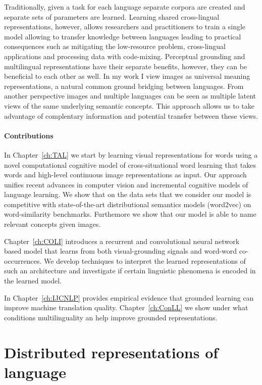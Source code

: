 Traditionally, given a task for each language separate corpora are created and
separate sets of parameters are learned.
Learning shared cross-lingual representations, however, allows researchers
and practitioners to train a single model allowing to transfer knowledge
between languages leading to practical consequences
such as mitigating the low-resource problem, cross-lingual applications and
processing data with code-mixing.
Perceptual grounding and multilingual representations have their separate benefits,
however, they can be beneficial to each other as well.
In my work I view images as universal meaning representations, a natural common
ground bridging between languages. From another perspective images and multiple
languages can be seen as multiple latent views of the same underlying semantic
concepts. This approach allows us to take advantage of complentary information
and potential transfer between these views.

\paragraph{Contributions}
In Chapter~\ref{ch:TAL} we start by learning visual representations for words using a
novel computational cognitive model of cross-situational word learning that
takes words and high-level continuous image representations as input. Our approach
unifies recent advances in computer vision and incremental cognitive models
of language learning. We show that on the data sets that we consider our model
is competitive with state-of-the-art distributional semantics models (word2vec)
on word-similarity benchmarks. Furthemore we show that our model is able to
name relevant concepts given images.

Chapter~\ref{ch:COLI} introduces a recurrent and convolutional neural network
based model that learns from both visual-grounding signals and
word-word co-occurrences. We develop techniques to interpret the learned
representations of such an architecture and investigate if certain linguistic
phenomena is encoded in the learned model.

In Chapter~\ref{ch:IJCNLP} provides empirical evidence that grounded learning
can improve machine translation quality.
Chapter~\ref{ch:ConLL} we show under what conditions multilinguality an help improve grounded
representations.

\section{Distributed representations of language}

